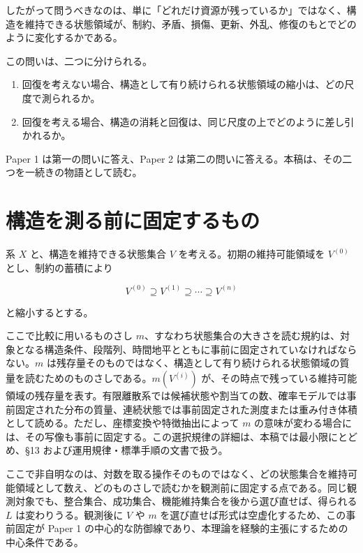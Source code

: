 \documentclass[12pt,a4paper]{article}
\begin{document}
したがって問うべきなのは、単に「どれだけ資源が残っているか」ではなく、構造を維持できる状態領域が、制約、矛盾、損傷、更新、外乱、修復のもとでどのように変化するかである。

この問いは、二つに分けられる。

\begin{enumerate}
\def\labelenumi{\arabic{enumi}.}
\tightlist
\item
  回復を考えない場合、構造として有り続けられる状態領域の縮小は、どの尺度で測られるか。
\item
  回復を考える場合、構造の消耗と回復は、同じ尺度の上でどのように差し引かれるか。
\end{enumerate}

Paper 1 は第一の問いに答え、Paper 2 は第二の問いに答える。本稿は、その二つを一続きの物語として読む。

\section{構造を測る前に固定するもの}\label{ux69cbux9020ux3092ux6e2cux308bux524dux306bux56faux5b9aux3059ux308bux3082ux306e}

系 \(X\) と、構造を維持できる状態集合 \(V\) を考える。初期の維持可能領域を \(V^{(0)}\) とし、制約の蓄積により

\[
V^{(0)} \supseteq V^{(1)} \supseteq \cdots \supseteq V^{(n)}
\]

と縮小するとする。

ここで比較に用いるものさし \(m\)、すなわち状態集合の大きさを読む規約は、対象となる構造条件、段階列、時間地平とともに事前に固定されていなければならない。\(m\) は残存量そのものではなく、構造として有り続けられる状態領域の質量を読むためのものさしである。\(m(V^{(i)})\) が、その時点で残っている維持可能領域の残存量を表す。有限離散系では候補状態や割当ての数、確率モデルでは事前固定された分布の質量、連続状態では事前固定された測度または重み付き体積として読める。ただし、座標変換や特徴抽出によって \(m\) の意味が変わる場合には、その写像も事前に固定する。この選択規律の詳細は、本稿では最小限にとどめ、§13 および運用規律・標準手順の文書で扱う。

ここで非自明なのは、対数を取る操作そのものではなく、どの状態集合を維持可能領域として数え、どのものさしで読むかを観測前に固定する点である。同じ観測対象でも、整合集合、成功集合、機能維持集合を後から選び直せば、得られる \(L\) は変わりうる。観測後に \(V\) や \(m\) を選び直せば形式は空虚化するため、この事前固定が Paper 1 の中心的な防御線であり、本理論を経験的主張にするための中心条件である。
\end{document}
